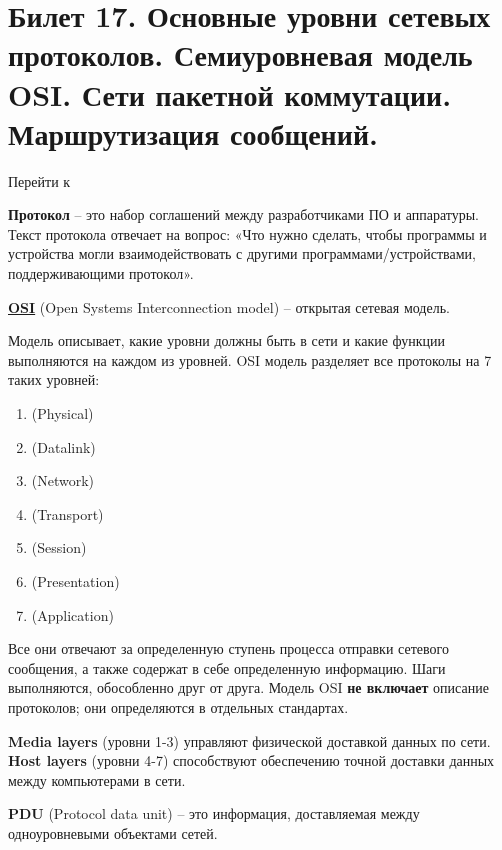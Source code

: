 \newpage
\section{Билет 17. Основные уровни сетевых протоколов. Семиуровневая модель OSI. Сети пакетной коммутации. Маршрутизация сообщений.}\label{b17:part1}

Перейти к~

\textbf{Протокол} -- это набор соглашений между разработчиками ПО и аппаратуры. Текст протокола отвечает на вопрос: «Что нужно сделать, чтобы программы и устройства могли взаимодействовать с другими программами/устройствами, поддерживающими протокол».

\href{https://clck.ru/BmJYw}{\textbf{OSI}} (Open Systems Interconnection model) -- открытая сетевая модель.

Модель описывает, какие уровни должны быть в сети и какие функции выполняются на каждом из уровней. OSI модель разделяет все протоколы на 7 таких уровней:
\begin{enumerate}
\item {} (Physical)
\item {} (Datalink)
\item {} (Network)
\item {} (Transport)
\item {} (Session)
\item {} (Presentation)
\item {} (Application)
\end{enumerate}

Все они отвечают за определенную ступень процесса отправки сетевого сообщения, а также содержат в себе определенную информацию. Шаги выполняются, обособленно друг от друга. Модель OSI \textbf{не включает} описание протоколов; они определяются в отдельных стандартах.

\textbf{Media layers} (уровни 1-3) управляют физической доставкой данных по сети. \\
\textbf{Host layers} (уровни 4-7) способствуют обеспечению точной доставки данных между компьютерами в сети.

\textbf{PDU} (Protocol data unit) -- это информация, доставляемая между одноуровневыми объектами сетей.

